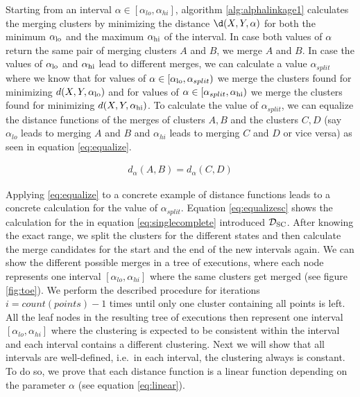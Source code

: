 Starting from an interval $\alpha \in [\alpha_{lo}, \alpha_{hi}]$, algorithm \ref{alg:alphalinkage1} calculates the merging clusters by minimizing the distance $\d(X,Y,\alpha)$ for both the minimum $\alpha_\text{lo}$ and the maximum $\alpha_\text{hi}$ of the interval. In case both values of $\alpha$ return the same pair of merging clusters $A$ and $B$, we merge $A$ and $B$. In case the values of $\alpha_\text{lo}$ and $\alpha_\text{hi}$ lead to different merges, we can calculate a value $\alpha_{split}$ where we know that for values of $\alpha \in [\alpha_\text{lo}, \alpha_{split})$ we merge the clusters found for minimizing $d(X,Y,\alpha_\text{lo})$ and for values of $\alpha \in [\alpha_{split}, \alpha_\text{hi})$ we merge the clusters found for minimizing $d(X,Y,\alpha_\text{hi})$. To calculate the value of $\alpha_{split}$, we can equalize the distance functions of the merges of clusters $A, B$ and the clusters $C, D$ (say $\alpha_{lo}$ leads to merging $A$ and $B$ and $\alpha_{hi}$ leads to merging $C$ and $D$ or vice versa) as seen in equation \ref{eq:equalize}. 

\begin{equation}
    \begin{aligned}
        d_{\alpha}(A,B) = d_{\alpha}(C,D)
    \end{aligned}
    \label{eq:equalize}
\end{equation}

Applying \ref{eq:equalize} to a concrete example of distance functions leads to a concrete calculation for the value of $\alpha_{split}$. Equation \ref{eq:equalizesc} shows the calculation for the in equation \ref{eq:singlecomplete} introduced $\mathcal{D}_\text{SC}$. After knowing the exact range, we split the clusters for the different states and then calculate the merge candidates for the start and the end of the new intervals again. We can show the different possible merges in a tree of executions, where each node represents one interval $[\alpha_{lo}, \alpha_{hi}]$ where the same clusters get merged (see figure \ref{fig:toe}). We perform the described procedure for iterations $i = count(points) -1$ times until only one cluster containing all points is left. All the leaf nodes in the resulting tree of executions then represent one interval $[\alpha_{lo}, \alpha_{hi}]$ where the clustering is expected to be consistent within the interval and each interval contains a different clustering. Next we will show that all intervals are well-defined, i.e.\ in each interval, the clustering always is constant. To do so, we prove that each distance function is a linear function depending on the parameter $\alpha$ (see equation \ref{eq:linear}).

